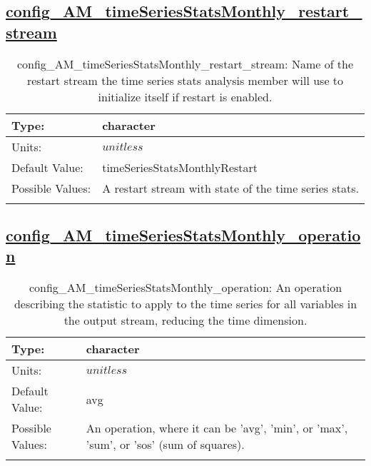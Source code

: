 \subsection[config\_AM\_timeSeriesStatsMonthly\_restart\_stream]{\hyperref[sec:nm_tab_AM_timeSeriesStatsMonthly]{config\_AM\_timeSeriesStatsMonthly\_restart\_stream}}
\label{subsec:nm_sec_config_AM_timeSeriesStatsMonthly_restart_stream}
\begin{center}
\begin{longtable}{| p{2.0in} || p{4.0in} |}
    \hline
    Type: & character \\
    \hline
    Units: & $unitless$ \\
    \hline
    Default Value: & timeSeriesStatsMonthlyRestart \\
    \hline
    Possible Values: & A restart stream with state of the time series stats. \\
    \hline
    \caption{config\_AM\_timeSeriesStatsMonthly\_restart\_stream: Name of the restart stream the time series stats analysis member will use to initialize itself if restart is enabled.}
\end{longtable}
\end{center}
\subsection[config\_AM\_timeSeriesStatsMonthly\_operation]{\hyperref[sec:nm_tab_AM_timeSeriesStatsMonthly]{config\_AM\_timeSeriesStatsMonthly\_operation}}
\label{subsec:nm_sec_config_AM_timeSeriesStatsMonthly_operation}
\begin{center}
\begin{longtable}{| p{2.0in} || p{4.0in} |}
    \hline
    Type: & character \\
    \hline
    Units: & $unitless$ \\
    \hline
    Default Value: & avg \\
    \hline
    Possible Values: & An operation, where it can be 'avg', 'min', or 'max', 'sum', or 'sos' (sum of squares). \\
    \hline
    \caption{config\_AM\_timeSeriesStatsMonthly\_operation: An operation describing the statistic to apply to the time series for all variables in the output stream, reducing the time dimension.}
\end{longtable}
\end{center}
